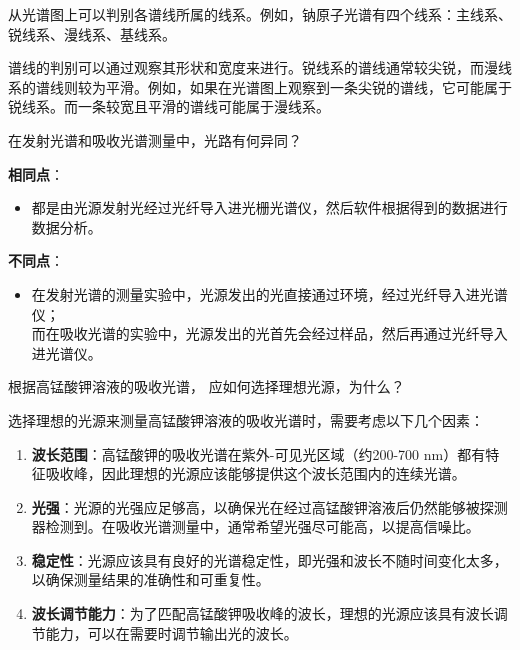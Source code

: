 \documentclass[dvipsnames, svgnames,a4paper,11pt]{article}
\begin{document}
	从光谱图上可以判别各谱线所属的线系。例如，钠原子光谱有四个线系：主线系、锐线系、漫线系、基线系。
	
%		
%		
%		
	
	
	谱线的判别可以通过观察其形状和宽度来进行。锐线系的谱线通常较尖锐，而漫线系的谱线则较为平滑。例如，如果在光谱图上观察到一条尖锐的谱线，它可能属于锐线系。而一条较宽且平滑的谱线可能属于漫线系。
	
	
\begin{question}
	在发射光谱和吸收光谱测量中，光路有何异同？
\end{question}
	
	\textbf{相同点}：
	\begin{itemize}
		\item 都是由光源发射光经过光纤导入进光栅光谱仪，然后软件根据得到的数据进行数据分析。
	
		
	\end{itemize}
	
	\textbf{不同点}：
	\begin{itemize}
		\item 在发射光谱的测量实验中，光源发出的光直接通过环境，经过光纤导入进光谱仪；\\
		而在吸收光谱的实验中，光源发出的光首先会经过样品，然后再通过光纤导入进光谱仪。
		
		
	\end{itemize}
	
	
	
\begin{question}
	根据高锰酸钾溶液的吸收光谱， 应如何选择理想光源，为什么？
\end{question}
	
	选择理想的光源来测量高锰酸钾溶液的吸收光谱时，需要考虑以下几个因素：
	
	\begin{enumerate}
		\item \textbf{波长范围}：高锰酸钾的吸收光谱在紫外-可见光区域（约200-700 nm）都有特征吸收峰，因此理想的光源应该能够提供这个波长范围内的连续光谱。
		
		\item \textbf{光强}：光源的光强应足够高，以确保光在经过高锰酸钾溶液后仍然能够被探测器检测到。在吸收光谱测量中，通常希望光强尽可能高，以提高信噪比。
		
		\item \textbf{稳定性}：光源应该具有良好的光谱稳定性，即光强和波长不随时间变化太多，以确保测量结果的准确性和可重复性。
		
		\item \textbf{波长调节能力}：为了匹配高锰酸钾吸收峰的波长，理想的光源应该具有波长调节能力，可以在需要时调节输出光的波长。
		
		
	\end{enumerate}
	
\end{document}

